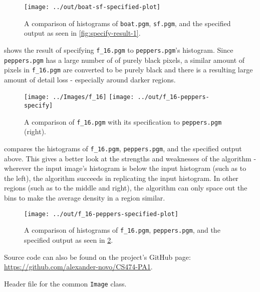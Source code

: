 \documentclass[headings=optiontoheadandtoc,listof=totoc,parskip=full]{scrartcl}
\newenvironment{longlisting}{\captionsetup{type=listing}}{}
\begin{document}
\begin{figure}[H]
	\centering\texttt{[image: ../out/boat-sf-specified-plot]}
	\caption{A comparison of histograms of \texttt{boat.pgm}, \texttt{sf.pgm}, and the specified output as seen in \cref{fig:specify-result-1}.}
	\label{fig:specify-histogram-1}
\end{figure}

 shows the result of specifying \texttt{f\_16.pgm} to \texttt{peppers.pgm}'s histogram. Since \texttt{peppers.pgm} has a large number of of purely black pixels, a similar amount of pixels in \texttt{f\_16.pgm} are converted to be purely black and there is a resulting large amount of detail loss - especially around darker regions.

\begin{figure}[H]
	\centering
	\texttt{[image: ../Images/f\_16]}
	\texttt{[image: ../out/f\_16-peppers-specify]}
	\caption{A comparison of \texttt{f\_16.pgm} with its specification to \texttt{peppers.pgm} (right).}
	\label{fig:specify-result-2}
\end{figure}

 compares the histograms of \texttt{f\_16.pgm}, \texttt{peppers.pgm}, and the specified output above. This gives a better look at the strengths and weaknesses of the algorithm - wherever the input image's histogram is below the input histogram (such as to the left), the algorithm succeeds in replicating the input histogram. In other regions (such as to the middle and right), the algorithm can only space out the bins to make the average density in a region similar.

\begin{figure}[H]
	\centering\texttt{[image: ../out/f\_16-peppers-specified-plot]}
	\caption{A comparison of histograms of \texttt{f\_16.pgm}, \texttt{peppers.pgm}, and the specified output as seen in \cref{fig:specify-result-2}.}
	\label{fig:specify-histogram-2}
\end{figure}

\clearpage
\listoflistings

Source code can also be found on the project's GitHub page: \url{https://github.com/alexander-novo/CS474-PA1}.

\begin{longlisting}
	\caption{Header file for the common \texttt{Image} class.}
\end{longlisting}
\end{document}

